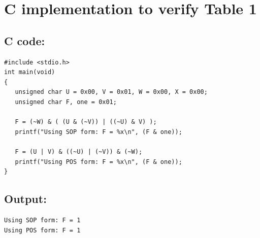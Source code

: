 \documentclass{article}
\begin{document}
\pagebreak{}

\section{C implementation to verify Table 1}
\subsection{C code:}
\begin{lstlisting}[style=CStyle]
#include <stdio.h>
int main(void)
{
   unsigned char U = 0x00, V = 0x01, W = 0x00, X = 0x00;
   unsigned char F, one = 0x01;
   
   F = (~W) & ( (U & (~V)) | ((~U) & V) );
   printf("Using SOP form: F = %x\n", (F & one));
   
   F = (U | V) & ((~U) | (~V)) & (~W);
   printf("Using POS form: F = %x\n", (F & one));
}
\end{lstlisting}
\subsection{Output:}
\begin{lstlisting}[style=CStyle]
Using SOP form: F = 1
Using POS form: F = 1
\end{lstlisting}

\hline
\end{document}
